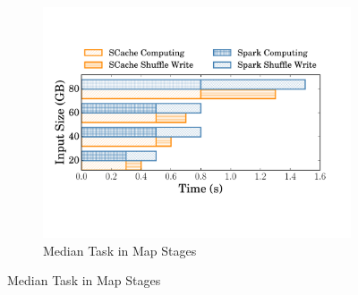 \begin{figure}
	\centering
	\begin{minipage}[t]{.32\linewidth}
		\begin{subfigure}{\linewidth}
			\begin{minipage}{\linewidth}
				\includegraphics[width=\linewidth]{fig/groupbymaptask}
				\caption{Median Task in Map Stages}
				\label{fig:maptask}
			\end{minipage}


\end{subfigure}
\end{minipage}
\end{figure}

